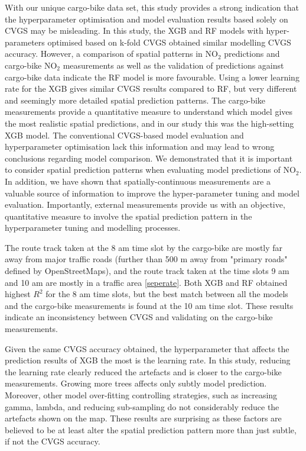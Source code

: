 \documentclass{article}
\begin{document}
With our unique cargo-bike data set, this study provides a strong indication that the hyperparameter optimisation and model evaluation results based solely on CVGS may be misleading. In this study, the XGB and RF models with hyper-parameters optimised based on k-fold CVGS obtained similar modelling CVGS accuracy. However, a comparison of spatial patterns in NO$_2$ predictions and cargo-bike NO$_2$ measurements as well as the validation of predictions against cargo-bike data indicate the RF model is more favourable. Using a lower learning rate for the XGB gives similar CVGS results compared to RF, but very different and seemingly more detailed spatial prediction patterns. The cargo-bike measurements provide a quantitative measure to understand which model gives the most realistic spatial predictions, and in our study this was the high-setting XGB model. The conventional CVGS-based model evaluation and hyperparameter optimisation lack this information and may lead to wrong conclusions regarding model comparison. We demonstrated that it is important to consider spatial prediction patterns when evaluating model predictions of NO$_2$. In addition, we have shown that spatially-continuous measurements are a valuable source of information to improve the hyper-parameter tuning and model evaluation. Importantly, external measurements provide us with an objective, quantitative measure to involve the spatial prediction pattern in the hyperparameter tuning and modelling processes. 

The route track taken at the 8 am time slot by the cargo-bike are mostly far away from major traffic roads (further than 500 m away from "primary roads" defined by OpenStreetMaps), and the route track taken at the time slots 9 am and 10 am are mostly in a traffic area \cref{seperate}. Both XGB and RF obtained highest $R^2$ for the 8 am time slots, but the best match between all the models and the cargo-bike measurements is found at the 10 am time slot. These results indicate an inconsistency between CVGS and validating on the cargo-bike measurements. 

Given the same CVGS accuracy obtained, the hyperparameter that affects the prediction results of XGB the most is the learning rate. In this study, reducing the learning rate clearly reduced the artefacts and is closer to the cargo-bike measurements. Growing more trees affects only subtly model prediction. Moreover, other model over-fitting controlling strategies, such as increasing gamma, lambda, and reducing sub-sampling do not considerably reduce the artefacts shown on the map. These results are surprising as these factors are believed to be at least alter the spatial prediction pattern more than just subtle, if not the CVGS accuracy.        
\end{document}
